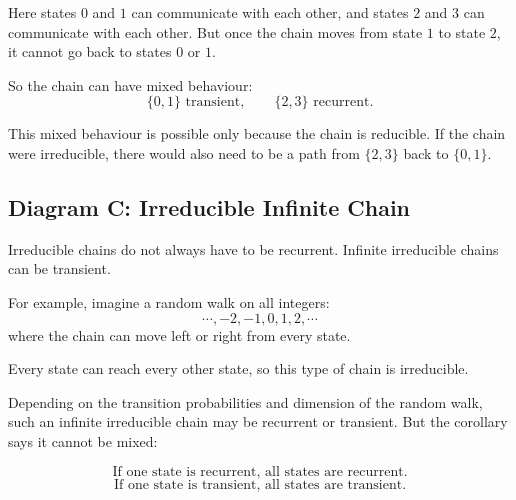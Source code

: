 \documentclass[12pt,a4paper]{article}
\theoremstyle{notestyle}
\begin{document}
Here states $0$ and $1$ can communicate with each other, and states $2$ and $3$ can communicate with each other. But once the chain moves from state $1$ to state $2$, it cannot go back to states $0$ or $1$.

So the chain can have mixed behaviour:
\[
\{0,1\}\text{ transient},\qquad \{2,3\}\text{ recurrent}.
\]

This mixed behaviour is possible only because the chain is reducible. If the chain were irreducible, there would also need to be a path from $\{2,3\}$ back to $\{0,1\}$.

\subsection{Diagram C: Irreducible Infinite Chain}

Irreducible chains do not always have to be recurrent. Infinite irreducible chains can be transient.

For example, imagine a random walk on all integers:
\[
\cdots,-2,-1,0,1,2,\cdots
\]
where the chain can move left or right from every state.

\begin{center}
\end{center}

Every state can reach every other state, so this type of chain is irreducible.

Depending on the transition probabilities and dimension of the random walk, such an infinite irreducible chain may be recurrent or transient. But the corollary says it cannot be mixed:

\[
\boxed{\text{If one state is recurrent, all states are recurrent.}}
\]
\[
\boxed{\text{If one state is transient, all states are transient.}}
\]
\end{document}
